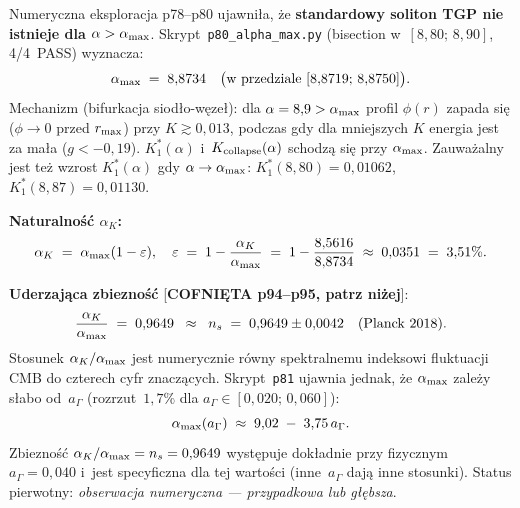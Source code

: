 \begin{remark}%
\label{rem:alpha-max-bifurcation}
Numeryczna eksploracja p78--p80 ujawni\l{}a, \.ze
\textbf{standardowy soliton TGP nie istnieje dla $\alpha > \alpha_{\rm max}$}.
Skrypt~\texttt{p80\_alpha\_max.py} (bisection w~$[8{,}80;\,8{,}90]$,
4/4~PASS) wyznacza:
\begin{equation}\label{eq:alpha-max-precise}
  \alpha_{\rm max} \;=\; 8{,}8734
  \quad\bigl(\text{w przedziale } [8{,}8719;\,8{,}8750]\bigr).
\end{equation}
Mechanizm (bifurkacja siod\l{}o-w\k{e}ze\l{}): dla
$\alpha = 8{,}9 > \alpha_{\rm max}$ profil $\phi(r)$ zapada si\k{e}
($\phi \to 0$ przed $r_{\rm max}$) przy $K \gtrsim 0{,}013$,
podczas gdy dla mniejszych $K$ energia jest za ma\l{}a ($g < -0{,}19$).
$K^*_1(\alpha)$ i~$K_{\rm collapse}(\alpha)$ schodz\k{a} si\k{e} przy $\alpha_{\rm max}$.
Zauwa\.zalny jest te\.z wzrost $K^*_1(\alpha)$ gdy $\alpha \to \alpha_{\rm max}$:
$K^*_1(8{,}80) = 0{,}01062$, $K^*_1(8{,}87) = 0{,}01130$.

\medskip\noindent
\textbf{Naturalno\'s\'c $\alpha_K$:}
\begin{equation}\label{eq:alpha-naturalness}
  \alpha_K \;=\; \alpha_{\rm max}(1 - \varepsilon),
  \quad
  \varepsilon \;=\; 1 - \frac{\alpha_K}{\alpha_{\rm max}}
              \;=\; 1 - \frac{8{,}5616}{8{,}8734}
              \;\approx\; 0{,}0351 \;=\; 3{,}51\%.
\end{equation}

\textbf{Uderzaj\k{a}ca zbiezno\'s\'c} [\textbf{COFNI\k{E}TA p94--p95, patrz ni\.zej}]:
\begin{equation}\label{eq:ns-coincidence}
  \frac{\alpha_K}{\alpha_{\rm max}} \;=\; 0{,}9649
  \;\;\approx\;\;
  n_s \;=\; 0{,}9649 \pm 0{,}0042 \quad (\text{Planck 2018}).
\end{equation}
Stosunek $\alpha_K/\alpha_{\rm max}$ jest numerycznie r\'owny
spektralnemu indeksowi fluktuacji CMB do czterech cyfr znacz\k{a}cych.
Skrypt~\texttt{p81} ujawnia jednak, \.ze $\alpha_{\rm max}$ zale\.zy
s\l{}abo od~$a_\Gamma$ (rozrzut~$1{,}7\%$ dla
$a_\Gamma \in [0{,}020;\,0{,}060]$):
\begin{equation}\label{eq:alpha-max-vs-agam}
  \alpha_{\rm max}(a_\Gamma) \;\approx\; 9{,}02 \;-\; 3{,}75\,a_\Gamma.
\end{equation}
Zbiezno\'s\'c $\alpha_K/\alpha_{\rm max} = n_s = 0{,}9649$
wyst\k{e}puje dok\l{}adnie przy fizycznym $a_\Gamma = 0{,}040$
i~jest specyficzna dla tej warto\'sci (inne~$a_\Gamma$ daj\k{a}
inne stosunki).
Status pierwotny: \emph{obserwacja numeryczna --- przypadkowa lub g\l{}\k{e}bsza}.


\end{remark}
